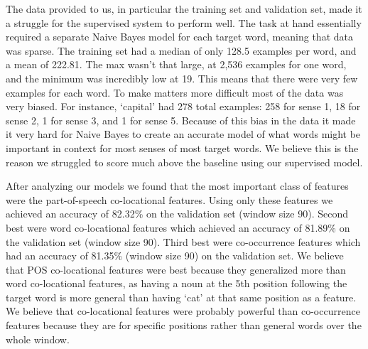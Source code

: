 \documentclass{article}
\begin{document}
The data provided to us, in particular the training set and validation set, made it a struggle for the supervised system to perform well. The task at hand essentially required a separate Naive Bayes model for each target word, meaning that data was sparse. The training set had a median of only 128.5 examples per word, and a mean of 222.81. The max wasn't that large, at 2,536 examples for one word, and the minimum was incredibly low at 19. This means that there were very few examples for each word. To make matters more difficult most of the data was very biased. For instance, `capital' had 278 total examples: 258 for sense 1, 18 for sense 2, 1 for sense 3, and 1 for sense 5. Because of this bias in the data it made it very hard for Naive Bayes to create an accurate model of what words might be important in context for most senses of most target words. We believe this is the reason we struggled to score much above the baseline using our supervised model. 

After analyzing our models we found that the most important class of features were the part-of-speech co-locational features. Using only these features we achieved an accuracy of 82.32\% on the validation set (window size 90). Second best were word co-locational features which achieved an accuracy of 81.89\% on the validation set (window size 90). Third best were co-occurrence features which had an accuracy of 81.35\% (window size 90) on the validation set. We believe that POS co-locational features were best because they generalized more than word co-locational features, as having a noun at the 5th position following the target word is more general than having `cat' at that same position as a feature. We believe that co-locational features were probably powerful than co-occurrence features because they are for specific positions rather than general words over the whole window.







\end{document}
